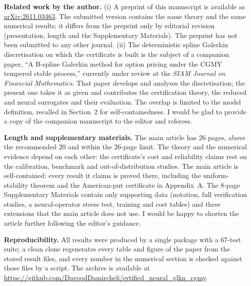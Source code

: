 \documentclass[11pt]{article}
\begin{document}
\textbf{Related work by the author.}
(i) A preprint of this manuscript is available as
\href{https://arxiv.org/abs/2611.03463}{arXiv:2611.03463}. The submitted version contains the same
theory and the same numerical results; it differs from the preprint only by editorial revision
(presentation, length and the Supplementary Materials). The preprint has not been submitted to any
other journal.
(ii) The deterministic spline Galerkin discretisation on which the certificate is built is the
subject of a companion paper, ``A B-spline Galerkin method for option pricing under the CGMY
tempered stable process,'' currently under review at the \emph{SIAM Journal on Financial
Mathematics}. That paper develops and analyses the discretisation; the present one takes it as
given and contributes the certification theory, the reduced and neural surrogates and their
evaluation. The overlap is limited to the model definition, recalled in Section~2 for
self-containedness. I would be glad to provide a copy of the companion manuscript to the editor
and referees.

\textbf{Length and supplementary materials.} The main article has 26 pages, above the recommended
20 and within the 26-page limit. The theory and the numerical evidence depend on each other: the
certificate's cost and reliability claims rest on the calibration, benchmark and out-of-distribution
studies. The main article is self-contained: every result it claims is proved there, including the
uniform-stability theorem and the American-put certificate in Appendix~A. The 8-page Supplementary
Materials contain only supporting data (notation, full verification studies, a neural-operator
stress test, training and cost tables) and three extensions that the main article does not use. I would be happy to shorten the article
further following the editor's guidance.

\textbf{Reproducibility.} All results were produced by a single package with a 67-test suite; a clean
clone regenerates every table and figure of the paper from the stored result files, and every number
in the numerical section is checked against those files by a script. The archive is available at
\url{https://github.com/DavoodDamircheli/ertified_neural_glkn_cgmy}.
\end{document}
